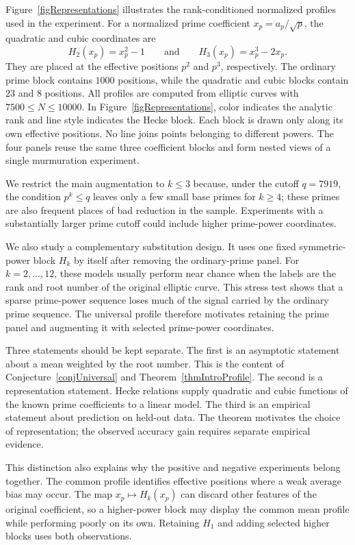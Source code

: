 \documentclass[12pt,reqno]{amsart}
\numberwithin{equation}{section}
\theoremstyle{plain}
\theoremstyle{definition}
\theoremstyle{remark}
\begin{document}
Figure~\ref{figRepresentations} illustrates the rank-conditioned normalized profiles used in the experiment.
For a normalized prime coefficient $x_p=a_p/\sqrt p$, the quadratic and cubic coordinates are
\begin{equation*}
H_2(x_p)=x_p^2-1
\qquad\text{and}\qquad
H_3(x_p)=x_p^3-2x_p.
\end{equation*}
They are placed at the effective positions $p^2$ and $p^3$, respectively.
The ordinary prime block contains $1000$ positions, while the quadratic and cubic blocks contain $23$ and $8$ positions.
All profiles are computed from elliptic curves with
$7500\leq N\leq10000$.
In Figure~\ref{figRepresentations}, color indicates the analytic rank and line style indicates the Hecke block.  Each block is drawn only along its own effective positions.
No line joins points belonging to different powers.
The four panels reuse the same three coefficient blocks and form nested views of a single murmuration experiment.

We restrict the main augmentation to $k\leq3$ because, under the cutoff $q=7919$, the condition $p^k\leq q$ leaves only a few small base primes for $k\geq4$; these primes are also frequent places of bad reduction in the sample.
Experiments with a substantially larger prime cutoff could include higher prime-power coordinates.

We also study a complementary substitution design.
It uses one fixed symmetric-power block $H_k$ by itself after removing the ordinary-prime panel.
For $k=2,\ldots,12$, these models usually perform near chance when the labels are the rank and root number of the original elliptic curve.
This stress test shows that a sparse prime-power sequence loses much of the signal carried by the ordinary prime sequence.
The universal profile therefore motivates retaining the prime panel and augmenting it with selected prime-power coordinates.

Three statements should be kept separate.
The first is an asymptotic statement about a mean weighted by the root number.
This is the content of Conjecture~\ref{conjUniversal} and
Theorem~\ref{thmIntroProfile}.
The second is a representation statement.
Hecke relations supply quadratic and cubic functions of the known prime coefficients to a linear model.
The third is an empirical statement about prediction on held-out data.
The theorem motivates the choice of representation; the observed accuracy gain requires separate empirical evidence.

This distinction also explains why the positive and negative experiments belong together.
The common profile identifies effective positions where a weak average bias may occur.
The map $x_p\mapsto H_k(x_p)$ can discard other features of the original coefficient, so a higher-power block may display the common mean profile while performing poorly on its own.
Retaining $H_1$ and adding selected higher blocks uses both observations.
\end{document}
